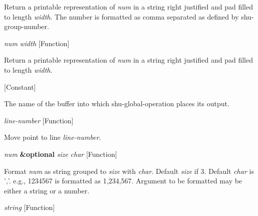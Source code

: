 \begin{doc-string}
Return a printable representation of \emph{num} in a string right justified
and pad filled to length \emph{width}.  The number is formatted as comma separated
as defined by shu-group-number.
\end{doc-string}

\vspace{1em}
\noindent
{}
\usebox{\funcname}\emph{num} \emph{width}
 \hfill [Function]

\begin{doc-string}
Return a printable representation of \emph{num} in a string right justified
and pad filled to length \emph{width}.
\end{doc-string}

\vspace{1em}
\noindent
{}
\usebox{\funcname}
 \hfill [Constant]

\begin{doc-string}
The name of the buffer into which shu-global-operation places its output.
\end{doc-string}

\vspace{1em}
\noindent
{}
\usebox{\funcname}\emph{line-number}
 \hfill [Function]

\begin{doc-string}
Move point to line \emph{line-number}.
\end{doc-string}

\vspace{1em}
\noindent
{}
\usebox{\funcname}\emph{num} \textbf{\&optional} \emph{size} \emph{char}
 \hfill [Function]

\begin{doc-string}
Format \emph{num} as string grouped to \emph{size} with \emph{char}.  Default \emph{size} if 3.  Default \emph{char}
is ','.  e.g., 1234567 is formatted as 1,234,567.  Argument to be formatted may be
either a string or a number.
\end{doc-string}

\vspace{1em}
\noindent
{}
\usebox{\funcname}\emph{string}
 \hfill [Function]

